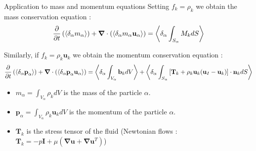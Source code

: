 \documentclass{sintefbeamer}
\newcommand{\nablab}{\bm{\nabla}}
\begin{document}
\begin{frame}
  {Application to mass and momentum equations}
  Setting $f_k = \rho_k$ we obtain the mass conservation equation :
  \begin{equation}
    \pddt   \left(\pavg{m_\alpha}\right)
    + \nablab \cdot \left(\pavg{m_\alpha \textbf{u}_\alpha}\right) 
    = 
     \pavg{\int_{S_\alpha} M_k d S}
    \label{eq:avg_p_mass}
\end{equation}

Similarly, if $f_k = \rho_k \textbf{u}_k$ we obtain the momentum conservation equation :
\begin{equation}
    \pddt   \left(\pavg{\textbf{p}_\alpha}\right)
    + \nablab \cdot \left(\pavg{\textbf{p}_\alpha \textbf{u}_\alpha}\right) 
    = \pavg{\int_{V_\alpha} \textbf{b}_k dV}
    + \pavg{\int_{S_\alpha} \left[
      \textbf{T}_k + \rho_k \textbf{u}_k (\textbf{u}_I-\textbf{u}_k) 
      \right] \cdot \textbf{n}_k d S}
    \label{eq:avg_p_global}
\end{equation}
\begin{itemize}
  \item $m_\alpha = \int_{V_\alpha} \rho_k dV$ is the mass of the particle $\alpha$.
  \item $\textbf{p}_\alpha = \int_{V_\alpha} \rho_k \textbf{u}_k dV$ is the momentum of the particle $\alpha$.
  \item $\textbf{T}_k$ is the stress tensor of the fluid (Newtonian flows : $\textbf{T}_k = -p\textbf{I} + \mu (\nablab \textbf{u}+ \nablab \textbf{u}^T) $)
\end{itemize}
\end{frame}
  
\end{document}
